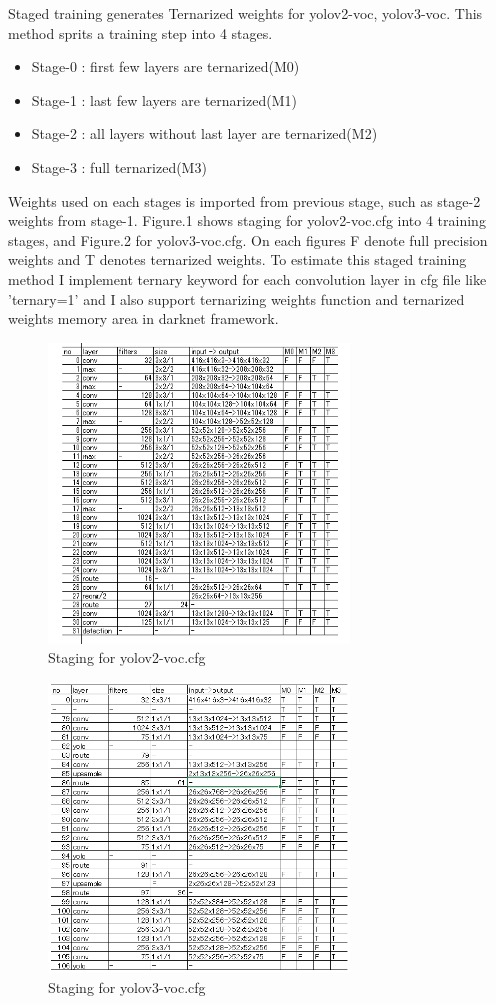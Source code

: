 \documentclass[twocolumn]{article}
\begin{document}
Staged training generates Ternarized weights for yolov2-voc, yolov3-voc.
This method sprits a training step into 4 stages.

\begin{itemize}
\item Stage-0 : first few layers are ternarized(M0)
\item Stage-1 : last few layers are ternarized(M1)
\item Stage-2 : all layers without last layer are ternarized(M2)
\item Stage-3 : full ternarized(M3)
\end{itemize}

Weights used on each stages is imported from previous stage, such as stage-2 weights from stage-1.
Figure.1 shows staging for yolov2-voc.cfg into 4 training stages, and Figure.2 for yolov3-voc.cfg.
On each figures F denote full precision weights and T denotes ternarized weights.
To estimate this staged training method I implement ternary keyword for each convolution layer in cfg file like 'ternary=1' and I also support ternarizing weights function and ternarized weights memory area in darknet framework.

\begin{figure}
\includegraphics[width=8cm]{yolov2-voc_Stages.png}
\caption{Staging for yolov2-voc.cfg}
\end{figure}

\begin{figure}
\includegraphics[width=8cm]{yolov3-voc_Stages.png}
\caption{Staging for yolov3-voc.cfg}
\end{figure}
\end{document}
